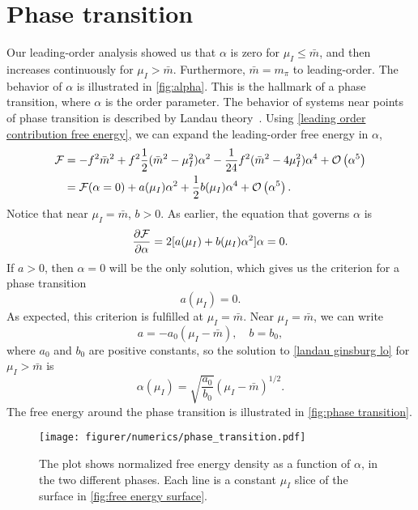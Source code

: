 \section{Phase transition}

Our leading-order analysis showed us that $\alpha$ is zero for $\mu_I \leq \bar m$, and then increases continuously for $\mu_I>\bar m$.
Furthermore, $\bar m = m_\pi$ to leading-order.
The behavior of $\alpha$ is illustrated in \autoref{fig:alpha}.
This is the hallmark of a phase transition, where $\alpha$ is the order parameter.
The behavior of systems near points of phase transition is described by Landau theory~\cite{Peskin:IntroQFT}.
Using \cref{leading order contribution free energy}, we can expand the leading-order free energy in $\alpha$,
\begin{align}
    \nonumber
    \Ef
    & = -f^2 \bar m^2 + f^2 \frac{1}{2}(\bar m^2 - \mu_I^2)\alpha^2
    - \frac{1}{24} f^2 (\bar m^2 - 4 \mu_I^2) \alpha^4 + \Oh[5]{\alpha} \\
    & = \Ef(\alpha=0) + a(\mu_I)\alpha^2 + \frac{1}{2} b(\mu_I)\alpha^4 + \Oh[5]{\alpha}.
\end{align}
Notice that near $\mu_I = \bar m$, $b > 0$.
As earlier, the equation that governs $\alpha$ is
\begin{equation}
    \label{landau ginsburg lo}
    \diffp{\Ef}{\alpha} = 2 [a(\mu_I) + b(\mu_I) \alpha^2] \alpha = 0.
\end{equation}
If $a>0$, then $\alpha = 0$ will be the only solution, which gives us the criterion for a phase transition 
\begin{equation}
    a(\mu_I) = 0.
\end{equation}
As expected, this criterion is fulfilled at $\mu_I = \bar m$.
Near $\mu_I = \bar m$, we can write
\begin{equation}
    a = - a_0 (\mu_I - \bar m), \quad b = b_0,
\end{equation}
where $a_0$ and $b_0$ are positive constants, so the solution to \cref{landau ginsburg lo} for $\mu_I>\bar m$ is
\begin{equation}
    \alpha(\mu_I) = \sqrt{\frac{a_0}{b_0}} (\mu_I - \bar m)^{1/2}.
\end{equation}
The free energy around the phase transition is illustrated in \autoref{fig:phase transition}.
\begin{figure}[h]
    \centering
    \texttt{[image: figurer/numerics/phase\_transition.pdf]}
    \caption{The plot shows normalized free energy density as a function of $\alpha$, in the two different phases. Each line is a constant $\mu_I$ slice of the surface in \autoref{fig:free energy surface}.}
    \label{fig:phase transition}
\end{figure}

